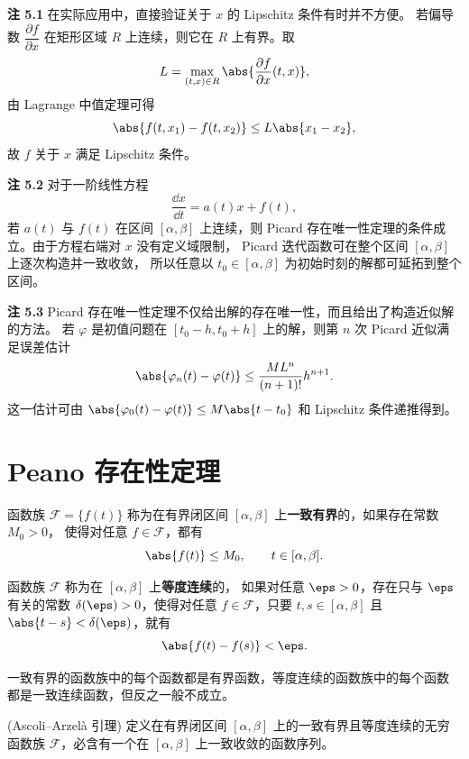 \noindent\textbf{注 5.1}\quad
在实际应用中，直接验证关于 $x$ 的 Lipschitz 条件有时并不方便。
若偏导数 $\dfrac{\partial f}{\partial x}$ 在矩形区域 $R$ 上连续，则它在
$R$ 上有界。取
\[
L=\max_{(t,x)\in R}
\abs{\dfrac{\partial f}{\partial x}(t,x)},
\]
由 Lagrange 中值定理可得
\[
\abs{f(t,x_1)-f(t,x_2)}
\leq L\abs{x_1-x_2},
\]
故 $f$ 关于 $x$ 满足 Lipschitz 条件。

\noindent\textbf{注 5.2}\quad
对于一阶线性方程
\[
\dfrac{\dd x}{\dd t}=a(t)x+f(t),
\]
若 $a(t)$ 与 $f(t)$ 在区间 $[\alpha,\beta]$ 上连续，则 Picard
存在唯一性定理的条件成立。由于方程右端对 $x$ 没有定义域限制，
Picard 迭代函数可在整个区间 $[\alpha,\beta]$ 上逐次构造并一致收敛，
所以任意以 $t_0\in[\alpha,\beta]$ 为初始时刻的解都可延拓到整个区间。

\noindent\textbf{注 5.3}\quad
Picard 存在唯一性定理不仅给出解的存在唯一性，而且给出了构造近似解的方法。
若 $\varphi$ 是初值问题在 $[t_0-h,t_0+h]$ 上的解，则第 $n$ 次
Picard 近似满足误差估计
\[
\abs{\varphi_n(t)-\varphi(t)}
\leq
\dfrac{ML^n}{(n+1)!}h^{n+1}.
\]
这一估计可由
$\abs{\varphi_0(t)-\varphi(t)}\leq M\abs{t-t_0}$
和 Lipschitz 条件递推得到。

\section{Peano 存在性定理}\label{sec:Peano存在性定理}

\begin{definition}\label{def:一致有界与等度连续}
	函数族 $\mathcal{F}=\{f(t)\}$ 称为在有界闭区间
	$[\alpha,\beta]$ 上\textbf{一致有界}的，如果存在常数 $M_0>0$，
	使得对任意 $f\in\mathcal{F}$，都有
	\[
		\abs{f(t)}\leq M_0,
		\qquad t\in[\alpha,\beta].
	\]

	函数族 $\mathcal{F}$ 称为在 $[\alpha,\beta]$ 上\textbf{等度连续}的，
	如果对任意 $\eps>0$，存在只与 $\eps$ 有关的常数
	$\delta(\eps)>0$，使得对任意 $f\in\mathcal{F}$，只要
	$t,s\in[\alpha,\beta]$ 且 $\abs{t-s}<\delta(\eps)$，就有
	\[
		\abs{f(t)-f(s)}<\eps.
	\]
\end{definition}

一致有界的函数族中的每个函数都是有界函数，等度连续的函数族中的每个函数
都是一致连续函数，但反之一般不成立。

\begin{lemma}(Ascoli--Arzelà 引理)\label{lem:AscoliArzela引理}
	定义在有界闭区间 $[\alpha,\beta]$ 上的一致有界且等度连续的无穷函数族
	$\mathcal{F}$，必含有一个在 $[\alpha,\beta]$ 上一致收敛的函数序列。
\end{lemma}

